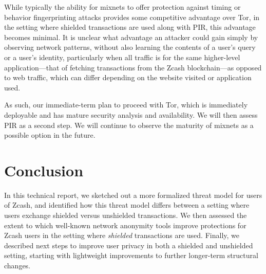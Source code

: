 \documentclass{article}
\begin{document}
While typically the
ability for mixnets to offer protection
against timing or behavior fingerprinting attacks provides some competitive
advantage over Tor, in the setting where shielded transactions are used along
with PIR, this advantage becomes minimal. It is unclear what advantage an
attacker could gain simply by observing network patterns, without also learning
the contents of a user's query or a user's identity, particularly when all
traffic is for the same higher-level application---that of fetching
transactions from the Zcash
blockchain---as opposed to web traffic, which can differ depending on the
website visited or application used.

As such, our immediate-term plan to proceed with Tor, which is
immediately deployable and has mature security analysis and availability. We
will then assess PIR as a second step. We will continue to observe the maturity
of mixnets as a possible option in the future.

\section{Conclusion}
\label{conclusion}

In this technical report, we sketched out a more formalized threat model for
users of Zcash, and identified how this threat model differs between a setting
where users exchange shielded versus unshielded transactions. We then assessed
the extent to which well-known network anonymity tools improve protections for
Zcash users in the setting where \emph{shielded} transactions are used.
Finally, we described next steps to improve user privacy in both a shielded and
unshielded setting, starting with lightweight improvements to further
longer-term structural changes.



\end{document}
